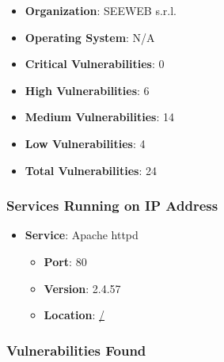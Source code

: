 \documentclass{article}
\begin{document}
\begin{itemize}
    \item \textbf{Organization}: SEEWEB s.r.l.
    \item \textbf{Operating System}:  N/A 
    \item \textbf{Critical Vulnerabilities}: 0
    \item \textbf{High Vulnerabilities}: 6
    \item \textbf{Medium Vulnerabilities}: 14
    \item \textbf{Low Vulnerabilities}: 4
    \item \textbf{Total Vulnerabilities}: 24
\end{itemize}

\subsubsection*{Services Running on IP Address}

\begin{itemize}
    
        \item \textbf{Service}: Apache httpd
        \begin{itemize}
            \item \textbf{Port}: 80
            \item \textbf{Version}:  2.4.57 
            \item \textbf{Location}: \href{ / }{ / }
        \end{itemize}
    
\end{itemize}


\subsubsection*{Vulnerabilities Found}
\end{document}
